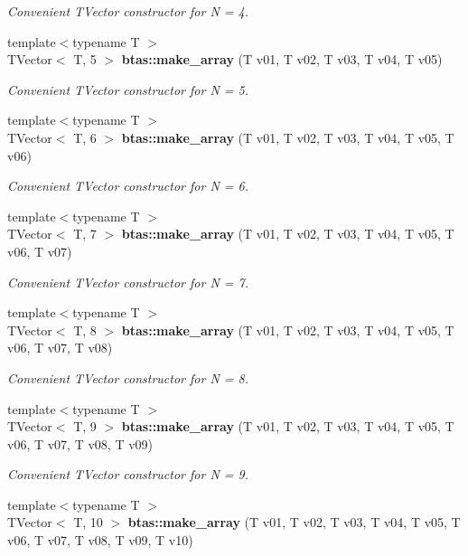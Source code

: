 \begin{DoxyCompactItemize}
\begin{DoxyCompactList}\small\item\em Convenient T\-Vector constructor for N = 4. \end{DoxyCompactList}\item 
{\footnotesize template$<$typename T $>$ }\\T\-Vector$<$ T, 5 $>$ {\bf btas\-::make\-\_\-array} (T v01, T v02, T v03, T v04, T v05)
\begin{DoxyCompactList}\small\item\em Convenient T\-Vector constructor for N = 5. \end{DoxyCompactList}\item 
{\footnotesize template$<$typename T $>$ }\\T\-Vector$<$ T, 6 $>$ {\bf btas\-::make\-\_\-array} (T v01, T v02, T v03, T v04, T v05, T v06)
\begin{DoxyCompactList}\small\item\em Convenient T\-Vector constructor for N = 6. \end{DoxyCompactList}\item 
{\footnotesize template$<$typename T $>$ }\\T\-Vector$<$ T, 7 $>$ {\bf btas\-::make\-\_\-array} (T v01, T v02, T v03, T v04, T v05, T v06, T v07)
\begin{DoxyCompactList}\small\item\em Convenient T\-Vector constructor for N = 7. \end{DoxyCompactList}\item 
{\footnotesize template$<$typename T $>$ }\\T\-Vector$<$ T, 8 $>$ {\bf btas\-::make\-\_\-array} (T v01, T v02, T v03, T v04, T v05, T v06, T v07, T v08)
\begin{DoxyCompactList}\small\item\em Convenient T\-Vector constructor for N = 8. \end{DoxyCompactList}\item 
{\footnotesize template$<$typename T $>$ }\\T\-Vector$<$ T, 9 $>$ {\bf btas\-::make\-\_\-array} (T v01, T v02, T v03, T v04, T v05, T v06, T v07, T v08, T v09)
\begin{DoxyCompactList}\small\item\em Convenient T\-Vector constructor for N = 9. \end{DoxyCompactList}\item 
{\footnotesize template$<$typename T $>$ }\\T\-Vector$<$ T, 10 $>$ {\bf btas\-::make\-\_\-array} (T v01, T v02, T v03, T v04, T v05, T v06, T v07, T v08, T v09, T v10)

\end{DoxyCompactItemize}
